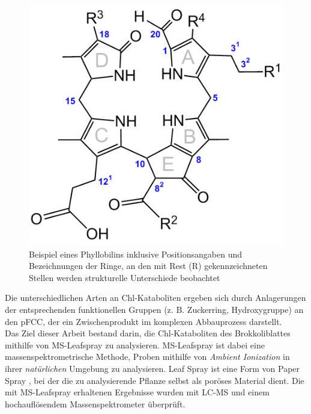 \documentclass[12pt,a4paper]{article}
\begin{document}
\begin{figure}[!hbtp]
  \centering
  \includegraphics[scale=0.5]{figures/Kapitel2/VWA_Chl-Nummerierung.png}
  \caption[Nummerierung von Phyllobilinen, Quelle: Autor]{Beispiel eines Phyllobilins inklusive Positionsangaben und Bezeichnungen der Ringe, an den mit Rest (R) gekennzeichneten Stellen werden strukturelle Unterschiede beobachtet}
  \label{fig:NummerierungPhyllobiline}
\end{figure}

Die unterschiedlichen Arten an Chl-Kataboliten ergeben sich durch Anlagerungen der entsprechenden funktionellen Gruppen (z. B. Zuckerring, Hydroxygruppe) an den pFCC, der ein Zwischenprodukt im komplexen Abbauprozess darstellt. \cite{ChlorophyllCatabolites} \\

Das Ziel dieser Arbeit bestand darin, die Chl-Kataboliten des Brokkoliblattes mithilfe von MS-Leafspray zu analysieren. MS-Leafspray ist dabei eine massenspektrometrische Methode, Proben mithilfe von \textit{Ambient Ionization} \cite{AmbientIonisation} in ihrer \textit{natürlichen} Umgebung zu analysieren. Leaf Spray ist eine Form von Paper Spray \cite{PaperSpray}, bei der die zu analysierende Pflanze selbst als poröses Material dient. Die mit MS-Leafspray erhaltenen Ergebnisse wurden mit LC-MS und einem hochauflösendem Massenspektrometer überprüft.

\pagebreak
\end{document}
